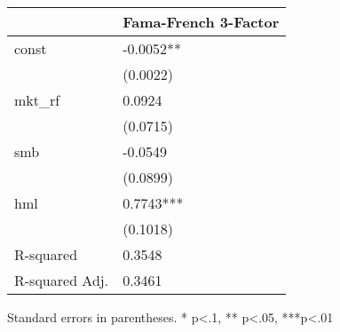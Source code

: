 \begin{table}
\caption{}
\label{}
\begin{center}
\begin{tabular}{ll}
\hline
               & Fama-French 3-Factor  \\
\hline
const          & -0.0052**             \\
               & (0.0022)              \\
mkt\_rf        & 0.0924                \\
               & (0.0715)              \\
smb            & -0.0549               \\
               & (0.0899)              \\
hml            & 0.7743***             \\
               & (0.1018)              \\
R-squared      & 0.3548                \\
R-squared Adj. & 0.3461                \\
\hline
\end{tabular}
\end{center}
\end{table}
\bigskip
Standard errors in parentheses. \newline 
* p<.1, ** p<.05, ***p<.01